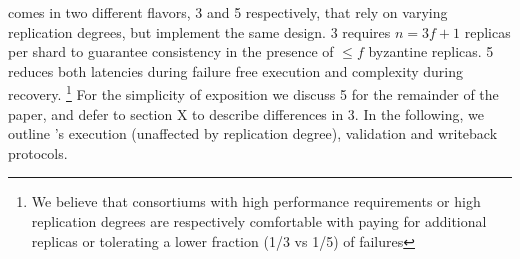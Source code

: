 
\sys comes in two different flavors, \sys{}3 and \sys{}5 respectively, that rely on varying replication degrees, but implement the same design. \sys{}3 requires $n=3f+1$ replicas  per shard to guarantee consistency in the presence of $\leq f$ byzantine replicas. \sys{}5 reduces both latencies during failure free execution and complexity during recovery. \footnote{We believe that consortiums with high performance requirements or high replication degrees are respectively comfortable with paying for additional replicas or tolerating a lower fraction (1/3 vs 1/5) of failures}
For the simplicity of exposition we discuss \sys{}5 for the remainder of the paper, and defer to section X  to describe differences in \sys{}3. In the following, we outline \sys 's execution (unaffected by replication degree), validation and writeback protocols.





%
%

%

%
%

%


%

 